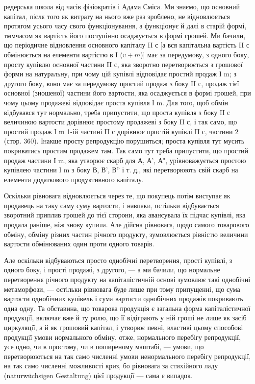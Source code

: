 \parcont{}  %
редерська школа від часів фізіократів і Адама Сміса. Ми знаємо, що основний
капітал, після того як витрату на нього вже раз зроблено, не відновлюється
протягом усього часу свого функціонування, а функціонує й
далі в старій формі, тммчасом як вартість його поступінно осаджується
в формі грошей. Ми бачили, що періодичне відновлення основного капіталу
II с [а вся капітальна вартість II с обмінюється на елементи вартістю
в І ($v + m$)] має за передумову, з одного боку, просту купівлю
основної частини II с, яка зворотно перетворюється з грошової форми
на натуральну, при чому цій купівлі відповідає простий продаж І m;
з другого боку, воно має за передумову простий продаж з боку
II с, продаж тієї основної (зношеної) частини його вартости, яка осаджується
в формі грошей, при чому цьому продажеві відповідає проста
купівля І m. Для того, щоб обмін відбувався тут нормально, треба припустити,
що проста купівля з боку II с величиною вартости дорівнює
простому продажеві з боку II с, і так само, що простий продаж І m
1-ій частині II с дорівнює простій купівлі II с, частини 2 (стор. 360).
Інакше просту репродукцію порушиться; проста купівля тут мусить
покриватись простим продажем там. Так само тут треба припустити,
що простий продаж частини І m, яка утворює скарб для А,
А', А", урівноважується простою купівлею частини І m з боку В, В', В''
і т. д., які перетворюють свій скарб на елементи додаткового продуктивного
капіталу.

Оскільки рівновага відновлюється через те, що покупець потім виступає
як продавець на таку саму суму вартости, і навпаки, остільки відбувається
зворотний приплив грошей до тієї сторони, яка авансувала їх
підчас купівлі, яка продала раніше, ніж знову купила. Але дійсна рівновага,
щодо самого товарового обміну, обміну різних частин річного продукту,
зумовлюється рівністю величини вартости обмінюваних один проти
одного товарів.

Але оскільки відбуваються просто однобічні перетворення, прості
купівлі, з одного боку, і прості продажі, з другого, — а ми бачили, що
нормальне перетворення річного продукту на капіталістичній основі зумовлює
такі однобічні метаморфози, — остільки рівновага буде лише при
тому припущенні, що сума вартости однобічних купівель і сума вартости
однобічних продажів покривають одна одну. Та обставина, що товарова
продукція є загальна форма капіталістичної продукції, включає вже й ту
ролю, що її відіграють у ній гроші не лише як засіб циркуляції, а й
як грошовий капітал, і утворює певні, властиві цьому способові продукції
умови нормального обміну, отже, нормального перебігу репродукції,
усе одно, чи в простому, чи в поширеному маштабі, — умови,
що перетворюються на так само численні умови ненормального перебігу
репродукції, на так само численні можливості криз, бо рівновага за стихійного
ладу (naturwüchsigen Gestaltung) цієї продукції — сама є випадок.

